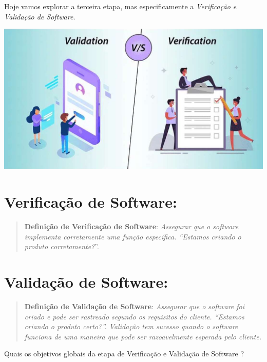 \documentclass[
]{book}
\begin{document}
Hoje vamos explorar a terceira etapa, mas especificamente a \emph{Verificação e Validação de Software}.

\includegraphics{images/verificacao-validacao.jpg}

\section{Verificação de Software:}\label{verificauxe7uxe3o-de-software}

\begin{quote}
\textbf{Definição de Verificação de Software}: \emph{Assegurar que o software implementa corretamente uma função específica. ``Estamos criando o produto corretamente?}''.
\end{quote}

\section{Validação de Software:}\label{validauxe7uxe3o-de-software}

\begin{quote}
\textbf{Definição de Validação de Software}: \emph{Assegurar que o software foi criado e pode ser rastreado segundo os requisitos do cliente. ``Estamos criando o produto certo?''. Validação tem sucesso quando o software funciona de uma maneira que pode ser razoavelmente esperada pelo cliente.}
\end{quote}

Quais os objetivos globais da etapa de Verificação e Validação de Software ?
\end{document}
